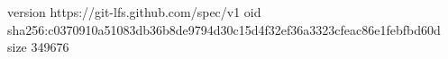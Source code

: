 version https://git-lfs.github.com/spec/v1
oid sha256:c0370910a51083db36b8de9794d30c15d4f32ef36a3323cfeac86e1febfbd60d
size 349676
